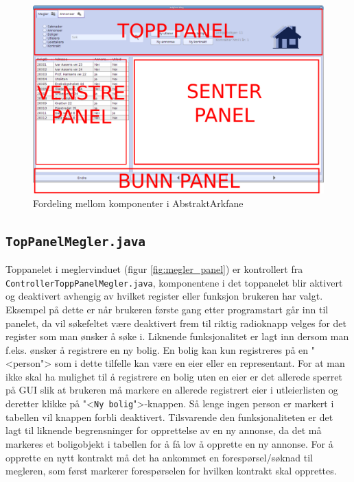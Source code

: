 \begin{figure}[ht]
 \includegraphics[width=\textwidth,height=\textheight,keepaspectratio]{./img/produktdokumentasjon/swing_componenter/AbstraktArkfane.png}
 \caption{Fordeling mellom komponenter i AbstraktArkfane}
 \label{fig:asbtarkfane}
\end{figure}



\subsection{\texttt{TopPanelMegler.java}} \label{subsec:meglerpanel}
Toppanelet i meglervinduet (figur \ref{fig:megler_panel}) er kontrollert fra \texttt{ControllerToppPanelMegler.java}, komponentene i det toppanelet blir aktivert og deaktivert avhengig av hvilket register eller funksjon brukeren har valgt. Eksempel på dette er når brukeren første gang etter programstart går inn til panelet, da vil søkefeltet være deaktivert frem til riktig radioknapp velges for det register som man ønsker å søke i. Liknende funksjonalitet er lagt inn dersom man f.eks. ønsker å registrere en ny bolig. En bolig kan kun registreres på en "<person"> som i dette tilfelle kan være en eier eller en representant. For at man ikke skal ha mulighet til å registrere en bolig uten en eier er det allerede sperret på GUI slik at brukeren må markere en allerede registrert eier i utleierlisten og deretter klikke på "<\texttt{Ny bolig}">-knappen. Så lenge ingen person er markert i tabellen vil knappen forbli deaktivert. Tilsvarende den funksjonaliteten er det lagt til liknende begrensninger for opprettelse av en ny annonse, da det må markeres et boligobjekt i tabellen for å få lov å opprette en ny annonse. For å opprette en nytt kontrakt må det ha ankommet en forespørsel/søknad til megleren, som først markerer forespørselen for hvilken kontrakt skal opprettes. 

